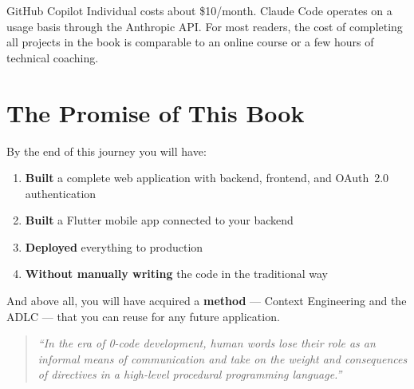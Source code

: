\begin{costbox}
GitHub Copilot Individual costs about \$10/month. Claude Code operates on a usage basis through the Anthropic API. For most readers, the cost of completing all projects in the book is comparable to an online course or a few hours of technical coaching.
\end{costbox}

\section{The Promise of This Book}

By the end of this journey you will have:
\begin{enumerate}
  \item \textbf{Built} a complete web application with backend, frontend, and OAuth~2.0 authentication
  \item \textbf{Built} a Flutter mobile app connected to your backend
  \item \textbf{Deployed} everything to production
  \item \textbf{Without manually writing} the code in the traditional way
\end{enumerate}

And above all, you will have acquired a \textbf{method} --- Context Engineering and the ADLC --- that you can reuse for any future application.

\bigskip
\begin{quote}
\itshape ``In the era of 0-code development, human words lose their role as an informal means of communication and take on the weight and consequences of directives in a high-level procedural programming language.''
\end{quote}
